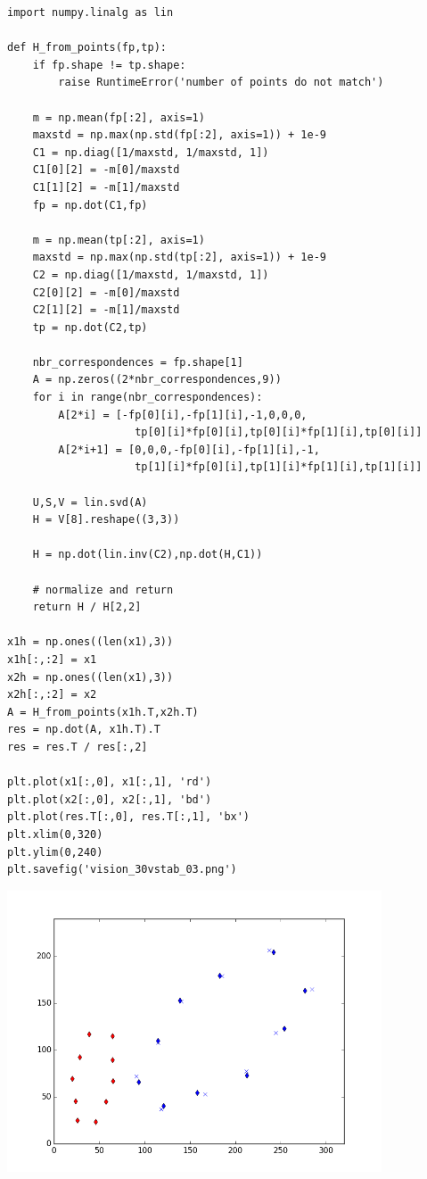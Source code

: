 \documentclass[12pt,fleqn]{article}\usepackage{../../common}
\begin{document}
\begin{verbatim}
import numpy.linalg as lin

def H_from_points(fp,tp):
    if fp.shape != tp.shape:
        raise RuntimeError('number of points do not match')
        
    m = np.mean(fp[:2], axis=1)
    maxstd = np.max(np.std(fp[:2], axis=1)) + 1e-9
    C1 = np.diag([1/maxstd, 1/maxstd, 1]) 
    C1[0][2] = -m[0]/maxstd
    C1[1][2] = -m[1]/maxstd
    fp = np.dot(C1,fp)
    
    m = np.mean(tp[:2], axis=1)
    maxstd = np.max(np.std(tp[:2], axis=1)) + 1e-9
    C2 = np.diag([1/maxstd, 1/maxstd, 1])
    C2[0][2] = -m[0]/maxstd
    C2[1][2] = -m[1]/maxstd
    tp = np.dot(C2,tp)
    
    nbr_correspondences = fp.shape[1]
    A = np.zeros((2*nbr_correspondences,9))
    for i in range(nbr_correspondences):        
        A[2*i] = [-fp[0][i],-fp[1][i],-1,0,0,0,
                    tp[0][i]*fp[0][i],tp[0][i]*fp[1][i],tp[0][i]]
        A[2*i+1] = [0,0,0,-fp[0][i],-fp[1][i],-1,
                    tp[1][i]*fp[0][i],tp[1][i]*fp[1][i],tp[1][i]]
    
    U,S,V = lin.svd(A)
    H = V[8].reshape((3,3))    
    
    H = np.dot(lin.inv(C2),np.dot(H,C1))
    
    # normalize and return
    return H / H[2,2]

x1h = np.ones((len(x1),3))
x1h[:,:2] = x1
x2h = np.ones((len(x1),3))
x2h[:,:2] = x2
A = H_from_points(x1h.T,x2h.T)
res = np.dot(A, x1h.T).T
res = res.T / res[:,2]

plt.plot(x1[:,0], x1[:,1], 'rd')
plt.plot(x2[:,0], x2[:,1], 'bd')
plt.plot(res.T[:,0], res.T[:,1], 'bx')
plt.xlim(0,320)
plt.ylim(0,240)
plt.savefig('vision_30vstab_03.png')
\end{verbatim}

\includegraphics[width=30em]{vision_30vstab_03.png}
\end{document}

